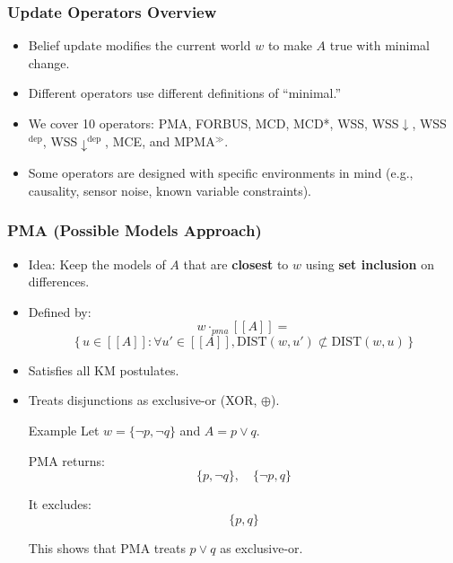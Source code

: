 \documentclass{beamer}
\begin{document}

\begin{frame}
\frametitle{Update Operators Overview}
\begin{itemize}
    \item Belief update modifies the current world $w$ to make $A$ true with minimal change.
    \item Different operators use different definitions of “minimal.”
    \item We cover 10 operators: PMA, FORBUS, MCD, MCD*, WSS, WSS$\downarrow$, WSS$^{\text{dep}}$, WSS$\downarrow^{\text{dep}}$, MCE, and MPMA$^{\gg}$.
    \item Some operators are designed with specific environments in mind (e.g., causality, sensor noise, known variable constraints).
\end{itemize}
\end{frame}

\begin{frame}
\frametitle{PMA (Possible Models Approach)}
\begin{itemize}
    \item Idea: Keep the models of $A$ that are \textbf{closest} to $w$ using \textbf{set inclusion} on differences.
    \item Defined by:
    \[
    w \cdot_{pma} [[A]] = 
    \]
    \[
    \{\, u \in [[A]] : \forall u' \in [[A]], \text{DIST}(w, u') \not\subset \text{DIST}(w, u) \,\}
    \]
    \item Satisfies all KM postulates.
    \item Treats disjunctions as exclusive-or (XOR, $\oplus$).
    \pause
    \begin{block}{Example}
    Let $w = \{\neg p, \neg q\}$ and $A = p \lor q$.
    
    PMA returns:
    \[
    \{p, \neg q\}, \quad \{\neg p, q\}
    \]
    
    It excludes:
    \[
    \{p, q\}
    \]
    
    This shows that PMA treats $p \lor q$ as exclusive-or.
    \end{block}
\end{itemize}
\end{frame}
\end{document}
